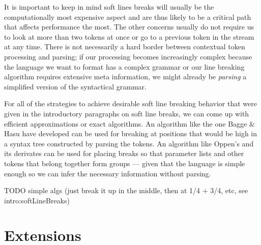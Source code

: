 It is important to keep in mind soft lines breaks will usually be the computationally
most expensive aspect and are thus likely to be a critical path that affects performance the most.
The other concerns usually do not require us to look at more than two tokens at once
or go to a previous token in the stream at any time.
There is not necessarily a hard border between contextual token processing and parsing;
if our processing becomes increasingly complex because the language we want to format
has a complex grammar or our line breaking algorithm requires extensive meta information,
we might already be \textit{parsing} a simplified version of the syntactical grammar.

For all of the strategies to achieve desirable soft line breaking behavior
that were given in the introductory paragraphs on soft line breaks,
we can come up with efficient approximations or exact algorithms.
An algorithm like the one Bagge \& Hasu have developed can be used for breaking at positions
that would be high in a syntax tree constructed by parsing the tokens.
An algorithm like Oppen's \autocite{prettyprinting} and its derivates
can be used for placing breaks so that parameter lists
and other tokens that belong together form groups ---
given that the language is simple enough
so we can infer the necessary information without parsing.

TODO
simple algs (just break it up in the middle, then at 1/4 + 3/4, etc, see intro:softLineBreaks)

\section{Extensions}

